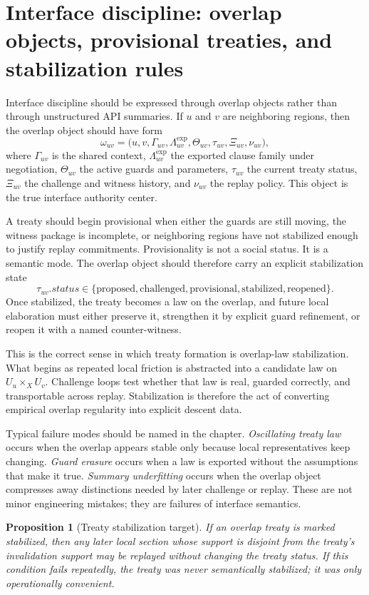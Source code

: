 \documentclass[11pt]{report}
\newtheorem{proposition}[definition]{Proposition}
\begin{document}
\section{Interface discipline: overlap objects, provisional treaties, and stabilization rules}
Interface discipline should be expressed through overlap objects rather than through unstructured API summaries. If $u$ and $v$ are neighboring regions, then the overlap object should have form
\[
\omega_{uv}
=
\bigl(
u,
v,
\Gamma_{uv},
\Lambda^{\mathrm{exp}}_{uv},
\Theta_{uv},
\tau_{uv},
\Xi_{uv},
\nu_{uv}
\bigr),
\]
where $\Gamma_{uv}$ is the shared context, $\Lambda^{\mathrm{exp}}_{uv}$ the exported clause family under negotiation, $\Theta_{uv}$ the active guards and parameters, $\tau_{uv}$ the current treaty status, $\Xi_{uv}$ the challenge and witness history, and $\nu_{uv}$ the replay policy. This object is the true interface authority center.

A treaty should begin provisional when either the guards are still moving, the witness package is incomplete, or neighboring regions have not stabilized enough to justify replay commitments. Provisionality is not a social status. It is a semantic mode. The overlap object should therefore carry an explicit stabilization state
\[
\tau_{uv}.status \in
\{\mathrm{proposed}, \mathrm{challenged}, \mathrm{provisional}, \mathrm{stabilized}, \mathrm{reopened}\}.
\]
Once stabilized, the treaty becomes a law on the overlap, and future local elaboration must either preserve it, strengthen it by explicit guard refinement, or reopen it with a named counter-witness.

This is the correct sense in which treaty formation is overlap-law stabilization. What begins as repeated local friction is abstracted into a candidate law on $U_u \times_X U_v$. Challenge loops test whether that law is real, guarded correctly, and transportable across replay. Stabilization is therefore the act of converting empirical overlap regularity into explicit descent data.

Typical failure modes should be named in the chapter. \emph{Oscillating treaty law} occurs when the overlap appears stable only because local representatives keep changing. \emph{Guard erasure} occurs when a law is exported without the assumptions that make it true. \emph{Summary underfitting} occurs when the overlap object compresses away distinctions needed by later challenge or replay. These are not minor engineering mistakes; they are failures of interface semantics.

\begin{proposition}[Treaty stabilization target]
If an overlap treaty is marked stabilized, then any later local section whose support is disjoint from the treaty's invalidation support may be replayed without changing the treaty status. If this condition fails repeatedly, the treaty was never semantically stabilized; it was only operationally convenient.
\end{proposition}
\end{document}
